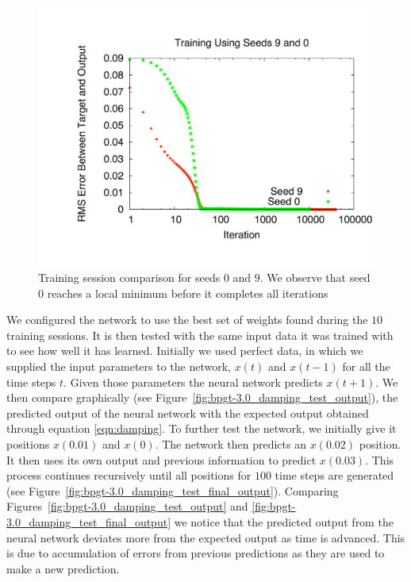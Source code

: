 \documentclass[11pt]{article}
\begin{document}
\begin{figure}[htbp]
	\centering
		\includegraphics[width=0.85\columnwidth]{../bpgt-3.0/damping_test/Trainings.pdf}
	\caption{Training session comparison for seeds $0$ and $9$. We observe that seed $0$ reaches a local minimum before it completes all iterations}
	\label{fig:bpgt-3.0_damping_test_Trainings}
\end{figure}

We configured the network to use the best set of weights found during the $10$ training sessions. It is then tested with the same input
data it was trained with to see how well it has learned. Initially we used perfect data, in which we supplied the input parameters to
the network, $x(t)$ and $x(t-1)$ for all the time steps $t$. Given those parameters the neural network predicts $x(t+1)$. We then
compare graphically (see Figure~\ref{fig:bpgt-3.0_damping_test_output}), the predicted output of the neural network with the expected
output obtained through equation \ref{eqn:damping}. To further test the network, we initially give it positions $x(0.01)$ and $x(0)$.
The network then predicts an $x(0.02)$ position. It then uses its own output and previous information to predict $x(0.03)$. This process
continues recursively until all positions for $100$ time steps are generated (see Figure~\ref{fig:bpgt-3.0_damping_test_final_output}).
Comparing Figures~\ref{fig:bpgt-3.0_damping_test_output} and \ref{fig:bpgt-3.0_damping_test_final_output} we notice that the predicted
output from the neural network deviates more from the expected output as time is advanced. This is due to accumulation of errors from
previous predictions as they are used to make a new prediction.
\end{document}
